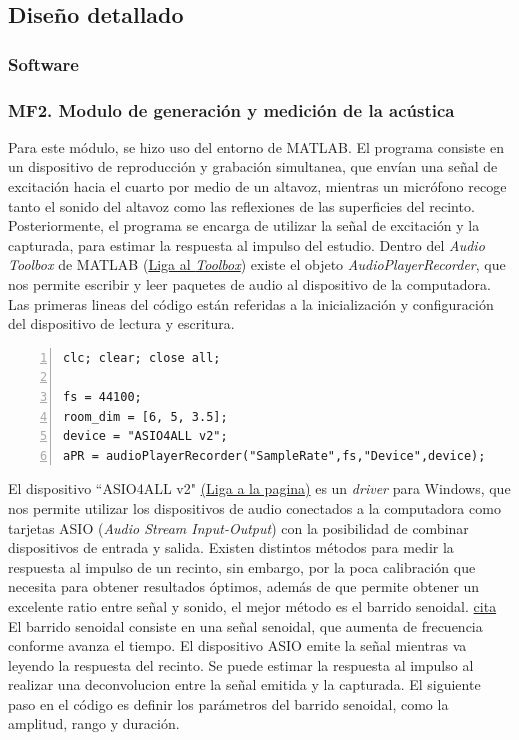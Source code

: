 \subsection{Diseño detallado}
\subsubsection{Software}
\subsubsection{MF2. Modulo de generación y medición de la acústica}

Para este módulo, se hizo uso del entorno de MATLAB. El programa consiste en un dispositivo de reproducción y grabación simultanea, que envían una señal de excitación hacia el cuarto por medio de un altavoz, mientras un micrófono recoge tanto el sonido del altavoz como las reflexiones de las superficies del recinto. Posteriormente, el programa se encarga de utilizar la señal de excitación y la capturada, para estimar la respuesta al impulso del estudio.\hfill \break
Dentro del \textit{Audio Toolbox} de MATLAB (\href{https://www.mathworks.com/products/audio.html}{Liga al \textit{Toolbox}}) existe  el objeto \textit{AudioPlayerRecorder}, que nos permite escribir y leer paquetes de audio al dispositivo de la computadora. \hfill \break
Las primeras lineas del código están referidas a la inicialización y configuración del dispositivo de lectura y escritura.\hfill \break
\begin{lstlisting}[frame=single,numbers=left, style=Matlab-editor, basicstyle=\tiny]
clc; clear; close all;

fs = 44100;
room_dim = [6, 5, 3.5];
device = "ASIO4ALL v2";
aPR = audioPlayerRecorder("SampleRate",fs,"Device",device);
\end{lstlisting}
El dispositivo ``ASIO4ALL v2" \href{https://asio4all.org/}{(Liga a la pagina)} es un \textit{driver} para Windows, que nos permite utilizar los dispositivos de audio conectados a la computadora como tarjetas ASIO (\textit{Audio Stream Input-Output}) con la posibilidad de combinar dispositivos de entrada y salida. \hfill\break
Existen distintos métodos para medir la respuesta al impulso de un recinto, sin embargo, por la poca calibración que necesita para obtener resultados óptimos, además de que permite obtener un excelente ratio entre señal y sonido, el mejor método es el barrido senoidal. \href{https://people.montefiore.uliege.be/stan/ArticleJAES.pdf}{cita} \hfill\break
El barrido senoidal consiste en una señal senoidal, que aumenta de frecuencia conforme avanza el tiempo. El dispositivo ASIO emite la señal mientras va leyendo la respuesta del recinto. Se puede estimar la respuesta al impulso al realizar una deconvolucion entre la señal emitida y la capturada. El siguiente paso en el código es definir los parámetros del barrido senoidal, como la amplitud, rango y duración.
